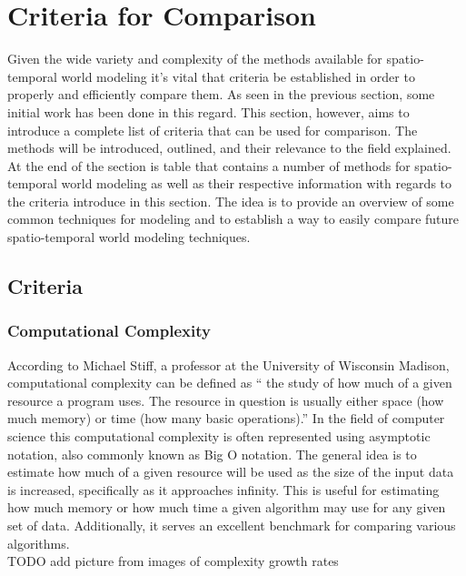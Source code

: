
  \chapter{Criteria for Comparison}

  Given the wide variety and complexity of the methods available for
  spatio-temporal world modeling it's vital that criteria be established in
  order to properly and efficiently compare them. As seen in the previous
  section, some initial work has been done in this regard. This section,
  however, aims to introduce a complete list of criteria that can be used
  for comparison. The methods will be introduced, outlined, and their relevance
  to the field explained. At the end of the section is table that contains
  a number of methods for spatio-temporal world modeling as well as their
  respective information with regards to the criteria introduce in this section.
  The idea is to provide an overview of some common techniques for modeling
  and to establish a way to easily compare future spatio-temporal world modeling
  techniques.


  \section{ Criteria }

  \subsection{ Computational Complexity }
  According to Michael Stiff, a professor at the University of Wisconsin
  Madison, computational complexity can be defined as `` the study of how much
  of a given resource a program uses. The resource in question is usually
  either space (how much memory) or time (how many basic operations).''
  \cite{ComplexityUW} In the field of computer science this computational
  complexity is often represented using asymptotic notation, also commonly
  known as Big O notation. The general idea is to estimate how much of a given
  resource will be used as the size of the input data is increased, specifically
  as it approaches infinity. This is useful for estimating how much memory or
  how much time a given algorithm may use for any given set of data.
  Additionally, it serves an excellent benchmark for comparing various
  algorithms.\\

  TODO add picture from images of complexity growth rates

